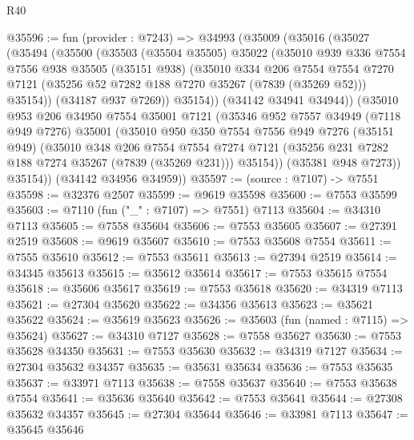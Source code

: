 \begin{lexlean}{R40}
\begin{coremodule}
@35596 := fun (provider : @7243) =>
  @34993
    (@35009
      (@35016
        (@35027
          (@35494
            (@35500
              (@35503
                (@35504 @35505)
                @35022
                (@35010
                  @939
                  @336
                  @7554
                  @7556
                  @938
                  @35505
                  (@35151 @938)
                  (@35010
                    @334
                    @206
                    @7554
                    @7554
                    @7270
                    @7121
                    (@35256 @52 @7282 @188 @7270 @35267 (@7839 (@35269 @52)))
                    @35154))
                (@34187 @937 @7269))
              @35154))
          (@34142 @34941 @34944))
        (@35010
          @953
          @206
          @34950
          @7554
          @35001
          @7121
          (@35346
            @952
            @7557
            @34949
            (@7118 @949 @7276)
            @35001
            (@35010
              @950
              @350
              @7554
              @7556
              @949
              @7276
              (@35151 @949)
              (@35010
                @348
                @206
                @7554
                @7554
                @7274
                @7121
                (@35256 @231 @7282 @188 @7274 @35267 (@7839 (@35269 @231)))
                @35154))
            (@35381 @948 @7273))
          @35154))
      (@34142 @34956 @34959))
@35597 := (source : @7107) -> @7551
@35598 := @32376 @2507
@35599 := @9619 @35598
@35600 := @7553 @35599
@35603 := @7110 (fun ("_" : @7107) => @7551) @7113
@35604 := @34310 @7113
@35605 := @7558 @35604
@35606 := @7553 @35605
@35607 := @27391 @2519
@35608 := @9619 @35607
@35610 := @7553 @35608 @7554
@35611 := @7555 @35610
@35612 := @7553 @35611
@35613 := @27394 @2519
@35614 := @34345 @35613
@35615 := @35612 @35614
@35617 := @7553 @35615 @7554
@35618 := @35606 @35617
@35619 := @7553 @35618
@35620 := @34319 @7113
@35621 := @27304 @35620
@35622 := @34356 @35613
@35623 := @35621 @35622
@35624 := @35619 @35623
@35626 := @35603 (fun (named : @7115) => @35624)
@35627 := @34310 @7127
@35628 := @7558 @35627
@35630 := @7553 @35628 @34350
@35631 := @7553 @35630
@35632 := @34319 @7127
@35634 := @27304 @35632 @34357
@35635 := @35631 @35634
@35636 := @7553 @35635
@35637 := @33971 @7113
@35638 := @7558 @35637
@35640 := @7553 @35638 @7554
@35641 := @35636 @35640
@35642 := @7553 @35641
@35644 := @27308 @35632 @34357
@35645 := @27304 @35644
@35646 := @33981 @7113
@35647 := @35645 @35646

\end{coremodule}
\end{lexlean}
